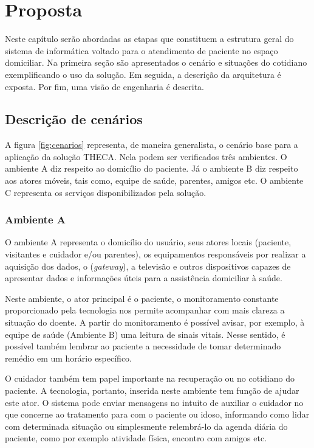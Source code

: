 \chapter{Proposta}\label{cap:proposta}

Neste capítulo serão abordadas as etapas que constituem a estrutura geral do
sistema de informática voltado para o atendimento de paciente no espaço domiciliar. 
Na primeira seção são apresentados o cenário e situações do cotidiano exemplificando
o uso da solução. Em seguida, a descrição da arquitetura é exposta. Por fim, uma
visão de engenharia é descrita.

\section{Descrição de cenários}

A figura \ref{fig:cenarios} representa, de maneira generalista, o cenário base
para a aplicação da solução THECA. Nela podem ser verificados três ambientes. O
ambiente A diz respeito ao domicílio do paciente. Já o ambiente B diz respeito
aos atores móveis, tais como, equipe de saúde, parentes, amigos etc. O ambiente
C representa os serviços disponibilizados pela solução.


\subsection{Ambiente A} \label{subsec:ambiente-a}

O ambiente A representa o domicílio do usuário, seus atores locais (paciente,
visitantes e cuidador e/ou parentes), os equipamentos responsáveis por  realizar
a aquisição dos dados, o \stb[] (\textit{gateway}), a televisão e outros
dispositivos capazes de apresentar dados e informações úteis para a assistência
domiciliar à saúde.

Neste ambiente, o ator principal é o paciente, o monitoramento constante 
proporcionado pela tecnologia nos permite acompanhar com mais clareza a situação
do doente. A partir do monitoramento é possível avisar, por exemplo, à equipe
de saúde (Ambiente B) uma leitura de sinais vitais. Nesse sentido, é possível 
também lembrar ao paciente a necessidade de tomar determinado remédio em um
horário específico.

O cuidador também tem papel importante na recuperação ou no cotidiano do 
paciente. A tecnologia, portanto, inserida neste ambiente tem função de ajudar
este ator. O sistema pode enviar mensagens no intuito de auxiliar o cuidador no
que concerne ao tratamento para com o paciente ou idoso, informando como lidar
com determinada situação ou simplesmente relembrá-lo da agenda diária do 
paciente, como por exemplo atividade física, encontro com amigos etc.

